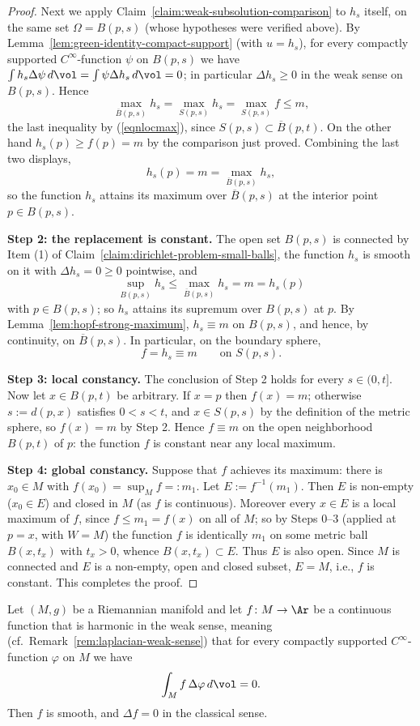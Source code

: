 \begin{proof}
Next we apply Claim~\ref{claim:weak-subsolution-comparison} to
$h_s$ itself, on the same set $\Omega=B(p,s)$ (whose hypotheses
were verified above). By
Lemma~\ref{lem:green-identity-compact-support} (with $u=h_s$), for
every compactly supported $C^\infty$-function $\psi$ on $B(p,s)$ we
have $\int h_s\Delta\psi\,d\vol=\int\psi\Delta h_s\,d\vol=0$; in
particular $\Delta h_s\ge0$ in the weak sense on $B(p,s)$. Hence
$$\max_{\overline{B}(p,s)}h_s=\max_{S(p,s)}h_s=\max_{S(p,s)}f\le
m,$$
the last inequality by (\ref{eqnlocmax}), since $S(p,s)\subset
\overline{B}(p,t)$. On the other hand $h_s(p)\ge f(p)=m$ by the
comparison just proved. Combining the last two displays,
$$h_s(p)=m=\max_{\overline{B}(p,s)}h_s,$$
so the function $h_s$ attains its maximum over
$\overline{B}(p,s)$ at the interior point $p\in B(p,s)$.

{\bf Step 2: the replacement is constant.} The open set $B(p,s)$ is
connected by Item (1) of
Claim~\ref{claim:dirichlet-problem-small-balls}, the function
$h_s$ is smooth on it with $\Delta h_s=0\ge0$ pointwise, and
$$\sup_{B(p,s)}h_s\le\max_{\overline{B}(p,s)}h_s=m=h_s(p)$$
with $p\in B(p,s)$; so $h_s$ attains its supremum over $B(p,s)$ at
$p$. By Lemma~\ref{lem:hopf-strong-maximum}, $h_s\equiv m$ on
$B(p,s)$, and hence, by continuity, on $\overline{B}(p,s)$. In
particular, on the boundary sphere,
$$f=h_s\equiv m\qquad\text{on } S(p,s).$$

{\bf Step 3: local constancy.} The conclusion of Step 2 holds for
every $s\in(0,t]$. Now let $x\in B(p,t)$ be arbitrary. If $x=p$
then $f(x)=m$; otherwise $s:=d(p,x)$ satisfies $0<s<t$, and $x\in
S(p,s)$ by the definition of the metric sphere, so $f(x)=m$ by
Step 2. Hence $f\equiv m$ on the open neighborhood $B(p,t)$ of
$p$: the function $f$ is constant near any local maximum.

{\bf Step 4: global constancy.} Suppose that $f$ achieves its
maximum: there is $x_0\in M$ with $f(x_0)=\sup_Mf=:m_1$. Let
$E:=f^{-1}(m_1)$. Then $E$ is non-empty ($x_0\in E$) and closed in
$M$ (as $f$ is continuous). Moreover every $x\in E$ is a local
maximum of $f$, since $f\le m_1=f(x)$ on all of $M$; so by Steps
0--3 (applied at $p=x$, with $W=M$) the function $f$ is identically
$m_1$ on some metric ball $B(x,t_x)$ with $t_x>0$, whence
$B(x,t_x)\subset E$. Thus $E$ is also open. Since $M$ is connected
and $E$ is a non-empty, open and closed subset, $E=M$, i.e., $f$ is
constant. This completes the proof.
\end{proof}

\begin{theorem}
\label{thm:weak-harmonic-regularity}
Let $(M,g)$ be a Riemannian manifold and let $f\colon M\to\Ar$ be a
continuous function that is harmonic in the weak sense, meaning
(cf.\ Remark~\ref{rem:laplacian-weak-sense}) that for every
compactly supported $C^\infty$-function $\varphi$ on $M$ we have
$$\int_Mf\,\Delta\varphi\,d\vol=0.$$
Then $f$ is smooth, and $\Delta f=0$ in the classical sense.
\end{theorem}

